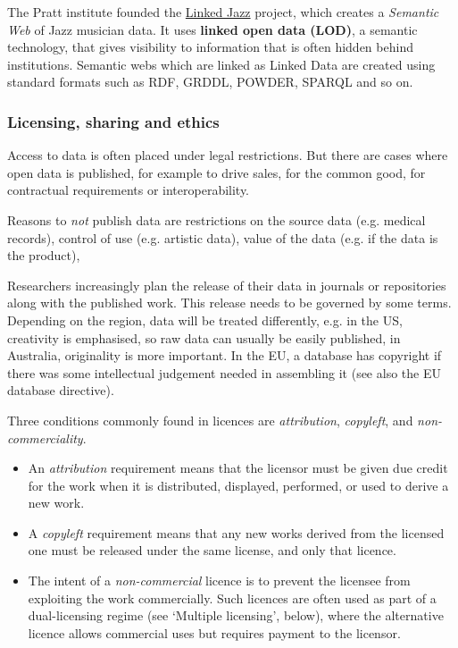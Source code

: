 The Pratt institute founded the \href{https://linkedjazz.org/}{Linked Jazz} project, which creates a \textit{Semantic Web} of Jazz musician data. It uses \textbf{linked open data (LOD)}, a semantic technology, that gives visibility to information that is often hidden behind institutions. Semantic webs which are linked as Linked Data are created using standard formats such as RDF, GRDDL, POWDER, SPARQL and so on.

\subsubsection{Licensing, sharing and ethics}

Access to data is often placed under legal restrictions. But there are cases where open data is published, for example to drive sales, for the common good,  for contractual requirements or interoperability.

Reasons to \textit{not} publish data are restrictions on the source data (e.g. medical records), control of use (e.g. artistic data), value of the data (e.g. if the data is the product), 

Researchers increasingly plan the release of their data in journals or repositories along with the published work. This release needs to be governed by some terms. Depending on the region, data will be treated differently, e.g. in the US, creativity is emphasised, so raw data can usually be easily published, in Australia, originality is more important. In the EU, a database has copyright if there was some intellectual judgement needed in assembling it (see also the EU database directive).

Three conditions commonly found in licences are \textit{attribution}, \textit{copyleft}, and \textit{non-commerciality}.

\begin{itemize}
	\item An \textit{attribution} requirement means that the licensor must be given due credit for the work when it is distributed, displayed, performed, or used to derive a new work.
	\item A \textit{copyleft} requirement means that any new works derived from the licensed one must be released under the same license, and only that licence.
	\item The intent of a \textit{non-commercial} licence is to prevent the licensee from exploiting the work commercially. Such licences are often used as part of a dual-licensing regime (see ‘Multiple licensing’, below), where the alternative licence allows commercial uses but requires payment to the licensor.
\end{itemize}

